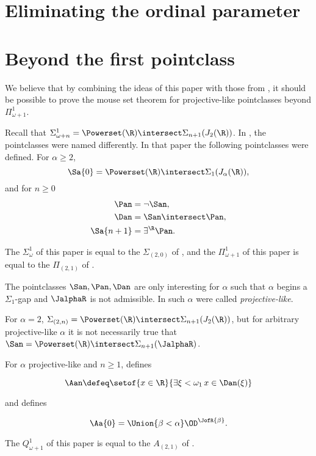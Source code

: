 \documentclass[oneside,12pt]{amsart}
\begin{document}
\section{Eliminating the ordinal parameter}
\label{section:eliminate_ordinal_parameterS}

\section{Beyond the first pointclass}
\label{section:beyond_first_pointclass}

We believe that by combining the ideas of this paper with those from
\cite{Mouse_Sets}, it should be possible to prove the mouse set theorem
for projective-like pointclasses beyond $\Pi^1_{\omega+1}$.

Recall that $\Sigma^1_{\omega+n} = \Powerset(\R)\intersect \Sigma_{n+1}(J_2(\R))$.
In \cite{Mouse_Sets}, the pointclasses were named differently. In that paper
the following pointclasses were defined. For $\alpha\geq 2$,
$$\Sa{0}=\Powerset(\R)\intersect \Sigma_{1}(J_{\alpha}(\R)),$$
and for $n\geq 0$
\begin{align*}
\Pan &= \neg \San, \\
\Dan &= \San \intersect \Pan, \\
\Sa{n+1} &= \exists^{\R} \Pan.
\end{align*}

The $\Sigma^1_{\omega}$ of this paper is equal
to the $\Sigma_{(2,0)}$ of \cite{Mouse_Sets}, and the
$\Pi^1_{\omega+1}$ of this paper is
equal to the $\Pi_{(2,1)}$ of \cite{Mouse_Sets}.

The pointclasses $\San,\Pan,\Dan$ are only interesting for $\alpha$ such that
$\alpha$ begins a $\Sigma_1$-gap and $\JalphaR$ is not admissible. In
\cite{Mouse_Sets} such $\alpha$ were called \emph{projective-like}.

For $\alpha=2$, $\Sigma_{(2,n)}=\Powerset(\R)\intersect \Sigma_{n+1}(J_2(\R))$,
but for arbitrary projective-like  $\alpha$ it is not necessarily true that
$\San = \Powerset(\R)\intersect \Sigma_{n+1}(\JalphaR)$.

For $\alpha$ projective-like and $n\geq 1$, \cite{Mouse_Sets} defines

$$\Aan\defeq\setof{x\in\R}{\exists \xi<\omega_1\, x\in \Dan(\xi)}$$

and defines

$$\Aa{0} = \Union{\beta<\alpha} \OD^{\JofR{\beta}}.$$

The $Q^1_{\omega+1}$ of this paper is equal to the $A_{(2,1)}$ of \cite{Mouse_Sets}.
\end{document}
